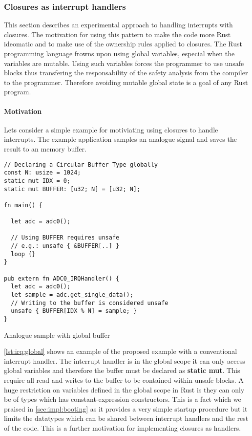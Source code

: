 \subsubsection{Closures as interrupt handlers}
\label{sec:irq-closures}

This section describes an experimental approach to handling interrupts with closures.
The motivation for using this pattern to make the code more Rust ideomatic and to make use of the ownership rules applied to closures.
The Rust programming language frowns upon using global variables, especial when the variables are mutable.
Using such variables forces the programmer to use unsafe blocks thus transfering the responsability of the safety analysis from the compiler to the programmer.
Therefore avoiding mutable global state is a goal of any Rust program.

\paragraph{Motivation}
\label{par:irq:motivation}

Lets consider a simple example for motiviating using closures to handle interrupts.
The example application samples an analogue signal and saves the result to an memory buffer.

\begin{listing}[H]
  \begin{verbatim}
// Declaring a Circular Buffer Type globally
const N: usize = 1024;
static mut IDX = 0;
static mut BUFFER: [u32; N] = [u32; N];

fn main() {

  let adc = adc0();

  // Using BUFFER requires unsafe
  // e.g.: unsafe { &BUFFER[..] }
  loop {}
}

pub extern fn ADC0_IRQHandler() {
  let adc = adc0();
  let sample = adc.get_single_data();
  // Writing to the buffer is considered unsafe
  unsafe { BUFFER[IDX % N] = sample; }
}
  \end{verbatim}
  \caption{Analogue sample with global buffer}
  \label{lst:irq:global}
\end{listing}

\autoref{lst:irq:global} shows an example of the proposed example with a conventional interrupt handler.
The interrupt handler is in the global scope it can only access global variables and therefore the buffer must be declared as \textbf{static mut}.
This require all read and writes to the buffer to be contained within unsafe blocks.
A huge restriction on variables defined in the global scope in Rust is they can only be of types which has constant-expression constructors.
This is a fact which we praised in \autoref{sec:impl:booting} as it provides a very simple startup procedure but it limits the datatypes which can be shared between interrupt handlers and the rest of the code.
This is a further motivation for implementing closures as handlers.


